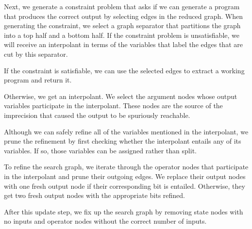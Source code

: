 \documentclass[authordraft,acmsmall,10pt]{acmart}
\begin{document}
Next, we generate a constraint problem that asks if we can generate a program
that produces the correct output by selecting edges in the reduced graph. When
generating the constraint, we select a graph separator that partitions the graph
into a top half and a bottom half. If the constraint problem is unsatisfiable,
we will receive an interpolant in terms of the variables that label the edges
that are cut by this separator.

If the constraint is satisfiable, we can use the selected edges to extract a
working program and return it.

Otherwise, we get an interpolant. We select the argument nodes whose output
variables participate in the interpolant. These nodes are the source of the
imprecision that caused the output to be spuriously reachable.

Although we can safely refine all of the variables mentioned in the interpolant,
we prune the refinement by first checking whether the interpolant entails any of
its variables. If so, those variables can be assigned rather than split.

To refine the search graph, we iterate through the operator nodes that
participate in the interpolant and prune their outgoing edges. We replace their
output nodes with one fresh output node if their corresponding bit is entailed.
Otherwise, they get two fresh output nodes with the appropriate bits refined.

After this update step, we fix up the search graph by removing state nodes with
no inputs and operator nodes without the correct number of inputs.


\end{document}

